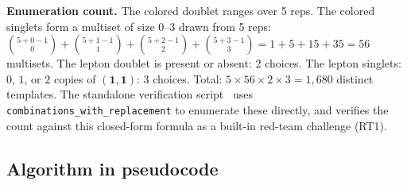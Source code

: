 \documentclass[11pt]{article}
\theoremstyle{definition}
\begin{document}
\smallskip\noindent\textbf{Enumeration count.}\quad
The colored doublet ranges over 5 reps.  The colored singlets form a
multiset of size $0$--$3$ drawn from 5 reps: $\binom{5+0-1}{0} +
\binom{5+1-1}{1} + \binom{5+2-1}{2} + \binom{5+3-1}{3} = 1 + 5 + 15
+ 35 = 56$ multisets.  The lepton doublet is present or absent: 2
choices.  The lepton singlets: $0$, $1$, or $2$ copies of
$(\mathbf{1},\mathbf{1})$: 3 choices.  Total:
$5 \times 56 \times 2 \times 3 = 1{,}680$ distinct templates.
The standalone verification script~\cite{BrookeFermionScan}
uses \texttt{combinations\_with\_replacement} to enumerate these
directly, and verifies the count against this closed-form formula
as a built-in red-team challenge (RT1).

\subsection{Algorithm in pseudocode}
\label{app:pseudocode}
\end{document}
